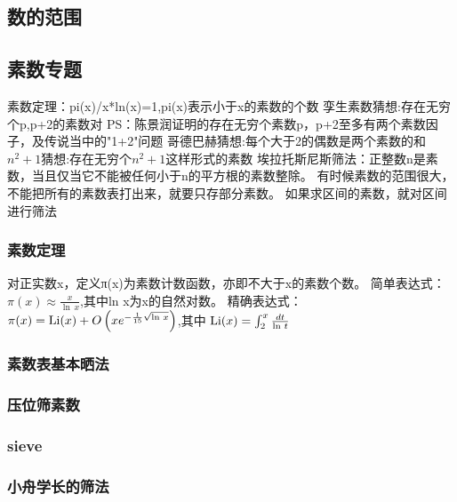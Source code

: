 \documentclass[a4paper]{article}
\begin{document}
\begin{CJK*}{UTF8}{gbsn}
\begin{multicols}{3}
\begin{flushleft}
\subsection{数的范围}


\subsection{素数专题}
素数定理：pi(x)/x*ln(x)=1,pi(x)表示小于x的素数的个数
孪生素数猜想:存在无穷个p,p+2的素数对
PS：陈景润证明的存在无穷个素数p，p+2至多有两个素数因子，及传说当中的"1+2"问题
哥德巴赫猜想:每个大于2的偶数是两个素数的和
$n^2+1$猜想:存在无穷个$n^2+1$这样形式的素数
埃拉托斯尼斯筛法：正整数n是素数，当且仅当它不能被任何小于n的平方根的素数整除。
有时候素数的范围很大，不能把所有的素数表打出来，就要只存部分素数。 
如果求区间的素数，就对区间进行筛法



\subsubsection{素数定理}
对正实数x，定义π(x)为素数计数函数，亦即不大于x的素数个数。
简单表达式：$\pi(x)\approx\frac{x}{\ln\,x}$,其中ln x为x的自然对数。
精确表达式：$\pi(x)={\rm Li} (x) + O \left(x e^{-\frac{1}{15}\sqrt{\ln\,x}}\right)$,其中 ${\rm Li} (x) = \int_2^x \frac{dt}{\ln\,t}$

\subsubsection{素数表基本晒法}


\subsubsection{压位筛素数}


\subsubsection{sieve}


\subsubsection{小舟学长的筛法}



\end{flushleft}
\end{multicols}
\end{CJK*}
\end{document}
